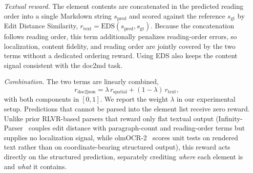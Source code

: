\textit{Textual reward.} The element contents are concatenated in the predicted reading order into a single Markdown string $s_{\mathrm{pred}}$ and scored against the reference $s_{\mathrm{gt}}$ by Edit Distance Similarity, $r_{\mathrm{text}}=\mathrm{EDS}(s_{\mathrm{pred}},s_{\mathrm{gt}})$. Because the concatenation follows reading order, this term additionally penalizes reading-order errors, so localization, content fidelity, and reading order are jointly covered by the two terms without a dedicated ordering reward. Using EDS also keeps the content signal consistent with the doc2md task.

\textit{Combination.} The two terms are linearly combined,
\begin{equation}
r_{\mathrm{doc2json}} = \lambda\,r_{\mathrm{spatial}} + (1-\lambda)\,r_{\mathrm{text}},
\end{equation}
with both components in $[0,1]$. We report the weight $\lambda$ in our experimental setup. Predictions that cannot be parsed into the element list receive zero reward. Unlike prior RLVR-based parsers that reward only flat textual output (Infinity-Parser~\cite{wang2025infinity} couples edit distance with paragraph-count and reading-order terms but supplies no localization signal, while olmOCR-2~\cite{poznanski2025olmocr2} scores unit tests on rendered text rather than on coordinate-bearing structured output), this reward acts directly on the structured prediction, separately crediting \emph{where} each element is and \emph{what} it contains.

